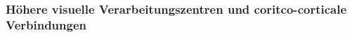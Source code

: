 \documentclass[12pt,a4paper,pdftex]{article}
\begin{document}

\subsubsection*{Höhere visuelle Verarbeitungszentren und coritco-corticale Verbindungen}
\end{document}
